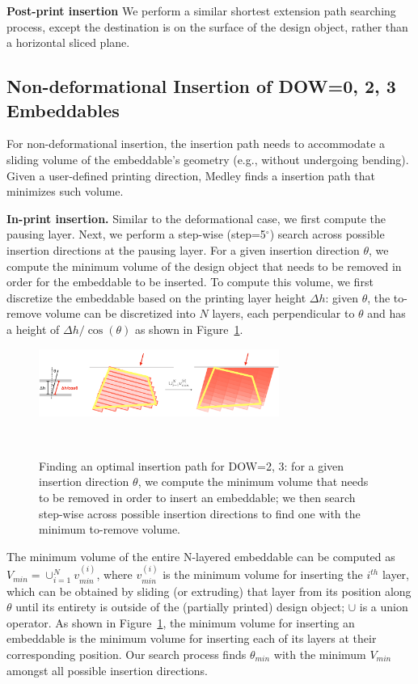 \textbf{Post-print insertion} We perform a similar shortest extension path searching process, except the destination is on the surface of the design object, rather than a horizontal sliced plane.


\subsection{Non-deformational Insertion of DOW=0, 2, 3 Embeddables}
For non-deformational insertion, the insertion path needs to accommodate a sliding volume of the embeddable's geometry (e.g., without undergoing bending). Given a user-defined printing direction, Medley finds a insertion path that minimizes such volume.

\textbf{In-print insertion.} Similar to the deformational case, we first compute the pausing layer. Next, we perform a step-wise (step=5$^{\circ}$) search across possible insertion directions at the pausing layer. For a given insertion direction $\theta$, we compute the minimum volume of the design object that needs to be removed in order for the embeddable to be inserted. To compute this volume, we first discretize the embeddable based on the printing layer height $\Delta h$: given $\theta$, the to-remove volume can be discretized into $N$ layers, each perpendicular to $\theta$ and has a height of ${\Delta h} / \cos(\theta)$ as shown in Figure~\ref{fig:dow023_insertion}. 

\begin{figure} [h]
  \centering
  \includegraphics[width=0.7\textwidth]{figures/dow023_insertion}
  \caption{Finding an optimal insertion path for DOW=2, 3: for a given insertion direction $\theta$, we compute the minimum volume that needs to be removed in order to insert an embeddable; we then search step-wise across possible insertion directions to find one with the minimum to-remove volume.}~\label{fig:dow023_insertion}
\end{figure}

The minimum volume of the entire N-layered embeddable can be computed as $V_{min} = \cup_{i=1}^N{v_{min}^{(i)}}$, where
$v_{min}^{(i)}$ is the minimum volume for inserting the $i^{th}$ layer, which can be obtained by sliding (or extruding) that layer from its position along $\theta$ until its entirety is outside of the (partially printed) design object; $\cup$ is a union operator.
As shown in Figure~\ref{fig:dow023_insertion}, the minimum volume for inserting an embeddable is the minimum volume for inserting each of its layers at their corresponding position.
Our search process finds $\theta_{min}$ with the minimum $V_{min}$ amongst all possible insertion directions.


